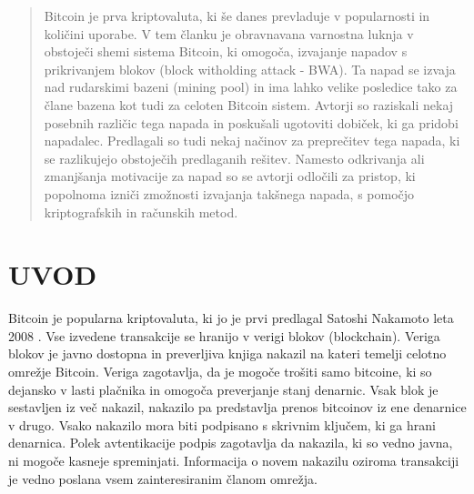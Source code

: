 \documentclass{acm_proc_article-sp}
\begin{document}
	\date{30 July 1999}
	
	\maketitle
\begin{abstract}

Bitcoin je prva kriptovaluta, ki še danes prevladuje v popularnosti in količini uporabe. V tem članku je obravnavana  varnostna luknja v obstoječi shemi sistema Bitcoin, ki omogoča, izvajanje napadov s prikrivanjem blokov (block witholding attack - BWA). Ta napad se izvaja nad rudarskimi bazeni (mining pool) in ima lahko velike posledice tako za člane bazena kot tudi za celoten Bitcoin sistem. Avtorji so raziskali nekaj posebnih različic tega napada in poskušali ugotoviti dobiček, ki ga pridobi napadalec. Predlagali so tudi nekaj načinov za preprečitev tega napada, ki se razlikujejo obstoječih predlaganih rešitev.
Namesto odkrivanja ali zmanjšanja motivacije za napad so se avtorji odločili za pristop, ki popolnoma izniči zmožnosti izvajanja takšnega napada, s pomočjo kriptografskih in računskih metod.

\end{abstract}

\section{UVOD} \label{sekcija1}

Bitcoin je popularna kriptovaluta, ki jo je prvi predlagal Satoshi Nakamoto leta 2008 \cite{nakamoto}. Vse izvedene transakcije se hranijo v verigi blokov (blockchain). Veriga blokov je javno dostopna in preverljiva knjiga nakazil na kateri temelji celotno omrežje Bitcoin. Veriga zagotavlja, da je mogoče trošiti samo bitcoine, ki so dejansko v lasti plačnika in omogoča preverjanje stanj denarnic. Vsak blok je sestavljen iz več nakazil, nakazilo pa predstavlja prenos bitcoinov iz ene denarnice v drugo. Vsako nakazilo mora biti podpisano s skrivnim ključem, ki ga hrani denarnica. Polek avtentikacije podpis zagotavlja da nakazila, ki so vedno javna, ni mogoče kasneje spreminjati. Informacija o novem nakazilu oziroma transakciji je vedno poslana vsem zainteresiranim članom omrežja.
\end{document}
